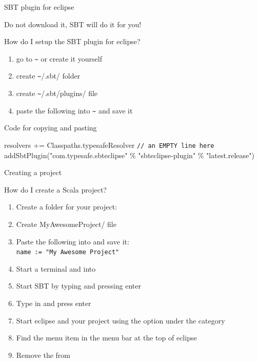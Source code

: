 \begin{frame}[fragile]{SBT plugin for eclipse}
\begin{center}
\end{center}
\begin{center}
\alert{Do not} download it, SBT will do it for you!
\end{center}
\begin{block}{How do I setup the SBT plugin for eclipse?}
\begin{enumerate}
  \item go to \lstinline!~! or create it yourself
  \item create \lstinline!~!/.sbt/ folder
  \item create \lstinline!~!/.sbt/plugins/ file
  \item paste the following into \lstinline!~! and save it
\end{enumerate}
\end{block}
\begin{exampleblock}{Code for copying and pasting}
\begin{small}
resolvers += Classpaths.typesafeResolver
\newline
\lstinline!// an EMPTY line here!
\newline
addSbtPlugin("com.typesafe.sbteclipse" \% "sbteclipse-plugin" \% "latest.release")
\end{small}
\end{exampleblock}
\end{frame}

\begin{frame}{Creating a project}
\begin{block}{How do I create a Scala project?}
\begin{enumerate}
  \item Create a folder for your project: 
  \item Create MyAwesomeProject/ file
  \item Paste the following into  and save it:\\
  \lstinline!name := "My Awesome Project"!
  \item Start a terminal and  into 
  \item Start SBT by typing  and pressing enter
  \item Type in  and press enter
  \item Start eclipse and  your project using
  the  option under the
   category
  \item Find the  menu item in the menu bar at the top of
  eclipse
  \item Remove the  from 
\end{enumerate}
\end{block}
\end{frame}

